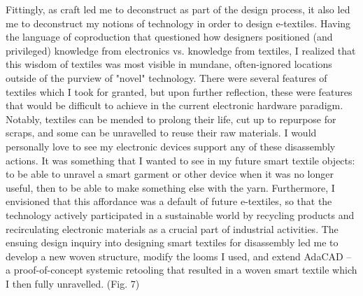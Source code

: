Fittingly, as craft led me to deconstruct as part of the design process, it also led me to deconstruct my notions of technology in order to design e-textiles.
Having the language of coproduction that questioned how designers positioned (and privileged) knowledge from electronics vs. knowledge from textiles, I realized that this wisdom of textiles was most visible in mundane, often-ignored locations outside of the purview of "novel" technology. There were several features of textiles which I took for granted, but upon further reflection, these were features that would be difficult to achieve in the current electronic hardware paradigm. 
Notably, textiles can be mended to prolong their life, cut up to repurpose for scraps, and some can be unravelled to reuse their raw materials. I would personally love to see my electronic devices support any of these disassembly actions. It was something that I wanted to see in my future smart textile objects: to be able to unravel a smart garment or other device when it was no longer useful, then to be able to make something else with the yarn. Furthermore, I envisioned that this affordance was a default of future e-textiles, so that the technology actively participated in a sustainable world by recycling products and recirculating electronic materials as a crucial part of industrial activities. The ensuing design inquiry into designing smart textiles for disassembly led me to develop a new woven structure, modify the looms I used, and extend AdaCAD -- a proof-of-concept systemic retooling that resulted in a woven smart textile which I then fully unravelled. (Fig. 7)



